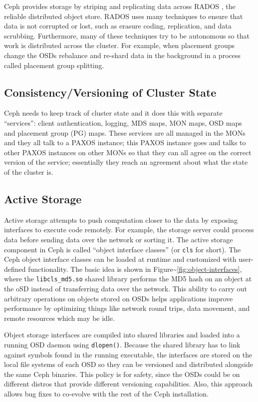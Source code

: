 \documentclass[10pt,twocolumn]{article}
\begin{document}
Ceph provides storage by striping and replicating data across RADOS
\autocite{weil_rados_2007}, the reliable distributed object store. RADOS
uses many techniques to ensure that data is not corrupted or lost, such
as erasure coding, replication, and data scrubbing. Furthermore, many of
these techniques try to be autonomous so that work is distributed across
the cluster. For example, when placement groups change the OSDs
rebalance and re-shard data in the background in a process called
placement group splitting.

\subsection{Consistency/Versioning of Cluster
State}\label{consistencyversioning-of-cluster-state}

Ceph needs to keep track of cluster state and it does this with separate
``services'': client authentication, logging, MDS maps, MON maps, OSD
maps and placement group (PG) maps. These services are all managed in
the MONs and they all talk to a PAXOS instance; this PAXOS instance goes
and talks to other PAXOS instances on other MONs so that they can all
agree on the correct version of the service; essentially they reach an
agreement about what the state of the cluster is.

\subsection{Active Storage}\label{active-storage}

Active storage attempts to push computation closer to the data by
exposing interfaces to execute code remotely. For example, the storage
server could process data before sending data over the network or
sorting it. The active storage component in Ceph is called ``object
interface classes'' (or \texttt{cls} for short). The Ceph object
interface classes can be loaded at runtime and customized with
user-defined functionality. The basic idea is shown in
Figure\textasciitilde{}\ref{fig:object-interfaces}, where the
\texttt{libcls\_md5.so} shared library performs the MD5 hash on an
object at the oSD instead of transferring data over the network. This
ability to carry out arbitrary operations on objects stored on OSDs
helps applications improve performance by optimizing things like network
round trips, data movement, and remote resources which may be idle.

Object storage interfaces are compiled into shared libraries and loaded
into a running OSD daemon using \texttt{dlopen()}. Because the shared
library has to link against symbols found in the running executable, the
interfaces are stored on the local file systems of each OSD so they can
be versioned and distributed alongside the same Ceph binaries. This
policy is for safety, since the OSDs could be on different distros that
provide different versioning capabilities. Also, this approach allows
bug fixes to co-evolve with the rest of the Ceph installation.
\end{document}
